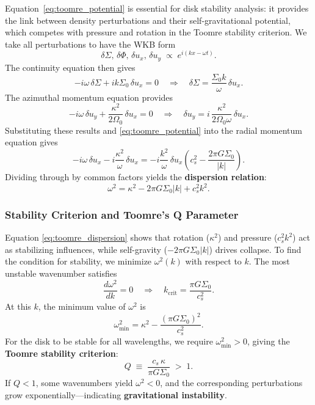 Equation~\eqref{eq:toomre_potential} is essential for disk stability analysis: 
it provides the link between density perturbations and their self-gravitational 
potential, which competes with pressure and rotation in the Toomre stability 
criterion.
We take all perturbations to have the WKB form
\[
\delta\Sigma,\,\delta\Phi,\,\delta u_x,\,\delta u_y \;\propto\; e^{i(kx - \omega t)}.
\]
The continuity equation then gives
\[
-i\omega\,\delta\Sigma + i k \Sigma_0\,\delta u_x = 0
\quad\Longrightarrow\quad
\delta\Sigma = \frac{\Sigma_0 k}{\omega}\,\delta u_x.
\]
The azimuthal momentum equation provides
\[
-i\omega\,\delta u_y + \frac{\kappa^2}{2\Omega_0}\,\delta u_x = 0
\quad\Longrightarrow\quad
\delta u_y = i\,\frac{\kappa^2}{2\Omega_0 \omega}\,\delta u_x.
\]
Substituting these results and \eqref{eq:toomre_potential} into the radial momentum equation gives
\[
-i\omega\,\delta u_x - i\frac{\kappa^2}{\omega}\,\delta u_x
= -i\frac{k^2}{\omega}\,\delta u_x
\left(c_s^2 - \frac{2\pi G \Sigma_0}{|k|}\right).
\]
Dividing through by common factors yields the \textbf{dispersion relation}:
\begin{equation}
\boxed{
\omega^2 = \kappa^2 - 2\pi G \Sigma_0 |k| + c_s^2 k^2.
}
\label{eq:toomre_dispersion}
\end{equation}

\subsubsection*{Stability Criterion and Toomre's Q Parameter}

Equation \eqref{eq:toomre_dispersion} shows that rotation ($\kappa^2$) and pressure ($c_s^2 k^2$) act as stabilizing influences, while self-gravity ($-2\pi G\Sigma_0 |k|$) drives collapse. To find the condition for stability, we minimize $\omega^2(k)$ with respect to $k$.  The most unstable wavenumber satisfies
\[
\frac{d\omega^2}{dk} = 0 \quad \Rightarrow \quad k_{\text{crit}} = \frac{\pi G \Sigma_0}{c_s^2}.
\]
At this $k$, the minimum value of $\omega^2$ is
\[
\omega_{\min}^2 = \kappa^2 - \frac{(\pi G \Sigma_0)^2}{c_s^2}.
\]
For the disk to be stable for all wavelengths, we require $\omega_{\min}^2 > 0$, giving the \textbf{Toomre stability criterion}:
\begin{equation}
\boxed{
Q \;\equiv\; \frac{c_s\,\kappa}{\pi G \Sigma_0} \;>\; 1.
}
\end{equation}
If $Q < 1$, some wavenumbers yield $\omega^2 < 0$, and the corresponding perturbations grow exponentially—indicating \textbf{gravitational instability}.

